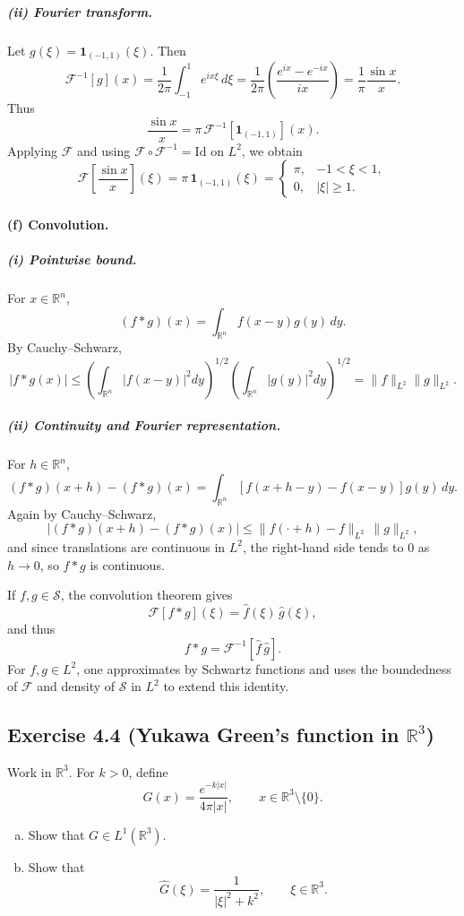 \documentclass[12pt,a4paper]{article}
\theoremstyle{plain}
\theoremstyle{definition}
\theoremstyle{remark}
\theoremstyle{remark}
\begin{document}
\subparagraph*{(ii) Fourier transform.}
Let $g(\xi)=\mathbf{1}_{(-1,1)}(\xi)$.  Then
\[
\mathcal{F}^{-1}[g](x)
= \frac{1}{2\pi}\int_{-1}^{1} e^{ix\xi}\,d\xi
= \frac{1}{2\pi}\left(\frac{e^{ix}-e^{-ix}}{ix}\right)
= \frac{1}{\pi}\frac{\sin x}{x}.
\]
Thus
\[
\frac{\sin x}{x}
= \pi\,\mathcal{F}^{-1}[\mathbf{1}_{(-1,1)}](x).
\]
Applying $\mathcal{F}$ and using $\mathcal{F}\circ\mathcal{F}^{-1}=\mathrm{Id}$
on $L^2$, we obtain
\[
\mathcal{F}\left[\frac{\sin x}{x}\right](\xi)
= \pi\,\mathbf{1}_{(-1,1)}(\xi)
=
\begin{cases}
	\pi, & -1<\xi<1,\\[0.3em]
	0,   & |\xi|\ge 1.
\end{cases}
\]

\paragraph{(f) Convolution.}
\subparagraph*{(i) Pointwise bound.}
For $x\in\mathbb{R}^n$,
\[
(f*g)(x) = \int_{\mathbb{R}^n} f(x-y)g(y)\,dy.
\]
By Cauchy--Schwarz,
\[
|f*g(x)|
\le \left(\int_{\mathbb{R}^n} |f(x-y)|^2 dy\right)^{1/2}
\left(\int_{\mathbb{R}^n} |g(y)|^2 dy\right)^{1/2}
= \|f\|_{L^2}\|g\|_{L^2}.
\]

\subparagraph*{(ii) Continuity and Fourier representation.}
For $h\in\mathbb{R}^n$,
\[
(f*g)(x+h)-(f*g)(x)
= \int_{\mathbb{R}^n} [f(x+h-y)-f(x-y)]g(y)\,dy.
\]
Again by Cauchy--Schwarz,
\[
|(f*g)(x+h)-(f*g)(x)|
\le \|f(\cdot+h)-f\|_{L^2}\,\|g\|_{L^2},
\]
and since translations are continuous in $L^2$, the right-hand side tends to
$0$ as $h\to 0$, so $f*g$ is continuous.

If $f,g\in\mathcal{S}$, the convolution theorem gives
\[
\mathcal{F}[f*g](\xi) = \widehat{f}(\xi)\,\widehat{g}(\xi),
\]
and thus
\[
f*g = \mathcal{F}^{-1}[\widehat{f}\,\widehat{g}].
\]
For $f,g\in L^2$, one approximates by Schwartz functions and uses the
boundedness of $\mathcal{F}$ and density of $\mathcal{S}$ in $L^2$ to extend
this identity.

\subsection*{Exercise 4.4 (Yukawa Green's function in $\mathbb{R}^3$)}

Work in $\mathbb{R}^3$. For $k>0$, define
\[
G(x) = \frac{e^{-k|x|}}{4\pi |x|}, \qquad x\in\mathbb{R}^3\setminus\{0\}.
\]

\begin{enumerate}[(a)]
	\item Show that $G \in L^{1}(\mathbb{R}^3)$.
	
	\item Show that
	\[
	\widehat{G}(\xi) = \frac{1}{|\xi|^2 + k^2},
	\qquad \xi\in\mathbb{R}^3.
	\]
\end{enumerate}
\end{document}
